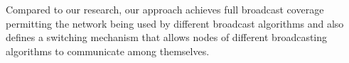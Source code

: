 Compared to our research, our approach achieves full broadcast coverage permitting the network being used by different broadcast algorithms and also defines a switching mechanism that allows nodes of different broadcasting algorithms to communicate among themselves.




